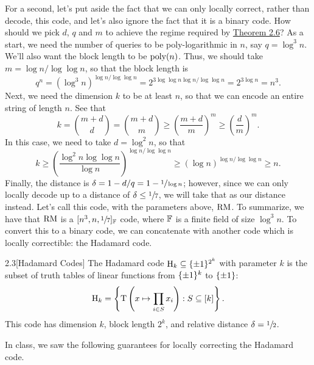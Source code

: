 \documentclass[11pt]{article}
\begin{document}
For a second, let's put aside the fact that we can only locally correct, rather than decode, this code, and let's also ignore the fact that it is a binary code. How should we pick $d$, $q$ and $m$ to achieve the regime required by \hyperref[t-2-6]{Theorem 2.6}? As a start, we need the number of queries to be poly-logarithmic in $n$, say $q = \log^3 n$. We'll also want the block length to be $\mathrm{poly}(n)$. Thus, we should take $m = \log n / \log \log n$, so that the block length is 
\begin{equation*}
    q^n = \left(\log^3 n\right)^{\log n / \log \log n} = 2^{3\log \log n \log n / \log \log n} = 2^{3\log n} = n^3.
\end{equation*}
Next, we need the dimension $k$ to be at least $n$, so that we can encode an entire string of length $n$. See that 
\begin{equation*}
    k = \binom{m + d}{d} = \binom{m + d}{m} \geq \left(\frac{m + d}{m}\right)^{m} \geq \left(\frac{d}{m}\right)^{m}.
\end{equation*}
In this case, we need to take $d = \log^2 n$, so that 
\begin{equation*}
    k \geq \left(\frac{\log^2 n \log \log n}{\log n}\right)^{\log n / \log \log n} \geq \left(\log n\right)^{\log n / \log \log n} \geq n.
\end{equation*}
Finally, the distance is $\delta = 1 - d / q = 1 - \sfrac{1}{\log n}$; however, since we can only locally decode up to a distance of $\delta \leq \sfrac{1}{7}$, we will take that as our distance instead. Let's call this code, with the parameters above, $\mathrm{RM}$. To summarize, we have that $\mathrm{RM}$ is a $[n^3, n, \sfrac{1}{7}]_{\mathbb{F}}$ code, where $\mathbb{F}$ is a finite field of size $\log^3 n$. To convert this to a binary code, we can concatenate with another code which is locally correctible: the Hadamard code.

\begin{definition}{2.3}[Hadamard Codes]
    The Hadamard code $\mathrm{H}_k \subseteq \{\pm 1\}^{2^k}$ with parameter $k$ is the subset of truth tables of linear functions from $\{\pm 1\}^k$ to $\{\pm 1\}$:
    \begin{equation*}
        \mathrm{H}_k = \left\{\mathrm{T}\left(x \mapsto \prod_{i \in S} x_i\right) : S \subseteq [k]\right\}.
    \end{equation*} 
    This code has dimension $k$, block length $2^k$, and relative distance $\delta = \sfrac{1}{2}$.
\end{definition}

In class, we saw the following guarantees for locally correcting the Hadamard code.
\end{document}
